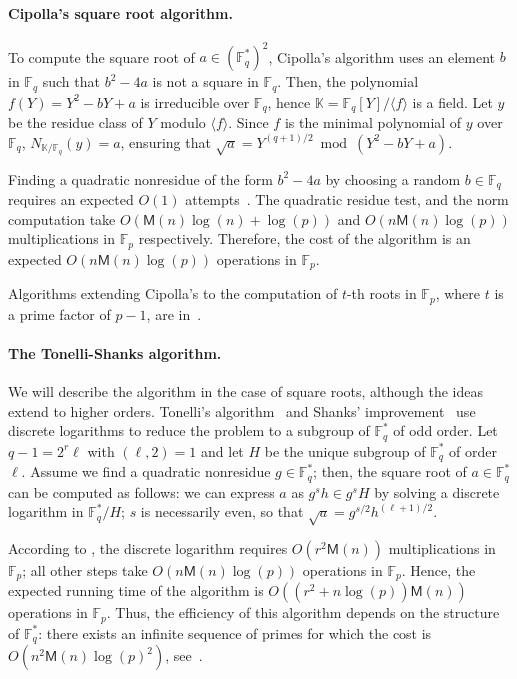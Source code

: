 \documentclass[12pt]{article}
\theoremstyle{plain}
\theoremstyle{definition}
\def\F{\mathbb{F}}
\def\K{\mathbb{K}}
\def\M{\mathsf{M}}
\newcounter{algorithm}
\begin{document}
\paragraph{Cipolla's square root algorithm.} 
To compute the square root of $a\in (\F_q^*)^2$, Cipolla's algorithm
uses an element $b$ in $\F_q$ such that $b^2 - 4a$ is not a square in
$\F_q$. Then, the polynomial $f(Y) = Y^2 - bY + a$ is irreducible over
$\F_q$, hence $\K=\F_q[Y]/\langle f\rangle$ is a field. Let $y$ be the
residue class of $Y$ modulo $\langle f\rangle$.  Since $f$ is the
minimal polynomial of $y$ over $\F_q$, $N_{\K/\F_q}(y) = a$, ensuring
that $\sqrt{a}=Y^{(q + 1) / 2} \bmod (Y^2 - bY + a)$.

Finding a quadratic nonresidue of the form $b^2 - 4a$ by choosing a
random $b \in \F_q$ requires an expected $O(1)$ attempts~\cite[page
  158]{BachSh1996}. The quadratic residue test, and the norm
computation take $O(\M(n)\log(n)+\log(p))$ and $O(n\M(n)\log(p))$
multiplications in $\F_p$ respectively. Therefore, the cost of the
algorithm is an expected $O(n\M(n)\log(p))$ operations in $\F_p$.

Algorithms extending Cipolla's to the computation of $t$-th roots in $\F_p$,
where $t$ is a prime factor of $p-1$, are
in~\cite{Williams72,WiHa93,NiHaSuKu09}.

\paragraph{The Tonelli-Shanks algorithm.}
We will describe the algorithm in the case of square roots, although
the ideas extend to higher orders. Tonelli's
algorithm~\cite{Tonelli1891} and Shanks' improvement~\cite{Shanks1972}
use discrete logarithms to reduce the problem to a subgroup of
$\F_q^*$ of odd order. Let $q - 1 = 2^r\ell$ with $(\ell, 2) = 1$ and
let $H$ be the unique subgroup of $\F_q^*$ of order $\ell$. Assume we
find a quadratic nonresidue $g \in \F_q^*$; then, the square root of
$a \in \F_q^*$ can be computed as follows: we can express $a$ as $g^sh
\in g^sH$ by solving a discrete logarithm in $\F_q^* / H$; $s$ is
necessarily even, so that $\sqrt{a} = g^{s / 2}h^{(\ell + 1) / 2}$.

According to \cite{Pohlig1978}, the discrete logarithm requires
$O(r^2\M(n))$ multiplications in $\F_p$; all other steps take
$O(n\M(n)\log(p))$ operations in $\F_p$. Hence, the expected running
time of the algorithm is $O((r^2 + n\log(p))\M(n))$ operations in
$\F_p$. Thus, the efficiency of this algorithm depends on the
structure of $\F_q^*$: there exists an infinite sequence of primes for
which the cost is $O(n^2\M(n)\log(p)^2)$, see~\cite{Tornaria2002}.
\end{document}
